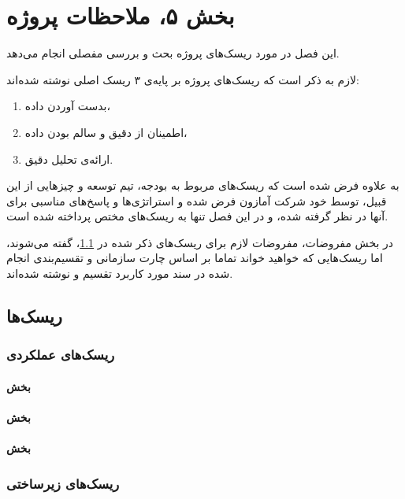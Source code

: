 \chapter{بخش ۵، ملاحظات پروژه\\}

این فصل در مورد ریسک‌های پروژه 
بحث و بررسی مفصلی انجام می‌دهد.

لازم به ذکر است که ریسک‌های پروژه بر پایه‌ی ۳ ریسک اصلی نوشته شده‌اند:
\begin{enumerate}
\item 
بدست‌ آوردن داده،
\item 
اطمینان از دقیق و سالم بودن داده،
\item 
ارائه‌ی تحلیل دقیق.
\end{enumerate}

به علاوه فرض شده است که ریسک‌های مربوط به بودجه، تیم توسعه و چیز‌‌هایی از این قبیل، توسط خود شرکت آمازون فرض شده و استراتژی‌ها و پاسخ‌های مناسبی برای آنها در نظر گرفته شده، و در این فصل تنها به ریسک‌های مختص 
پرداخته شده است.

در بخش مفروضات، مفروضات لازم برای ریسک‌های ذکر شده در 
\ref{risks}،
گفته می‌شوند، اما ریسک‌هایی که خواهید خواند تماما بر اساس چارت سازمانی و تقسیم‌بندی انجام شده در سند مورد کاربرد تقسیم و نوشته شده‌اند.

\section{ریسک‌ها }\label{risks}

\subsection{ریسک‌های عملکردی}
\subsubsection{بخش }
\subsubsection{بخش }
\subsubsection{بخش }

\subsection{ریسک‌های زیرساختی}
